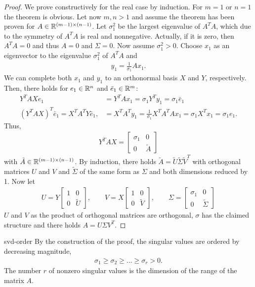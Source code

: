 \begin{proof}
  We prove constructively for the real case by induction. For $m=1$ or
  $n=1$ the theorem is obvious. Let now $m,n>1$ and assume the theorem
  has been proven for $A\in \mathbb R^{(m-1)\times (n-1)}$. Let $\sigma_1^2$
  be the largest eigenvalue of $A^TA$, which due to the symmetry of
  $A^TA$ is real and nonnegative. Actually, if it is zero, then
  $A^TA=0$ and thus $A=0$ and $\Sigma=0$. Now assume $\sigma_1^2 >
  0$. Choose $x_1$ as an eigenvector to the eigenvalue $\sigma_1^2$ of
  $A^TA$ and
  \begin{gather}
    y_1 = \frac1{\sigma_1} A x_1.
  \end{gather}
  We can complete both $x_1$ and $y_1$ to an orthonormal basis $X$ and
  $Y$, respectively. Then, there holds for $e_1 \in \mathbb R^n$ and
  $\bar e_1\in \mathbb R^m$:
  \begin{align}
    Y^TAX e_1 &= Y^T A x_1 = \sigma_1 Y^Ty_1 = \sigma_1 \bar e_1\\
    (Y^TAX)^T \bar e_1 = X^TA^TY\bar e_1,
              &= X^TA^T y_1 =  \tfrac1{\sigma_1} X^TA^TA x_1
                = \sigma_1 X^Tx_1 = \sigma_1 e_1.
  \end{align}
  Thus,
  \begin{gather}
    Y^TAX =
    \begin{bmatrix}
      \sigma_1 & 0 \\ 0 & \tilde A
    \end{bmatrix}
  \end{gather}
  with $\tilde A\in \mathbb R^{(m-1)\times (n-1)}$. By induction, there holds
  $\tilde A = \tilde U \tilde \Sigma \tilde V^T$ with orthogonal
  matrices $U$ and $V$ and $\tilde\Sigma$ of the same form as $\Sigma$
  and both dimensions reduced by 1. Now let
  \begin{gather}
    U = Y
    \begin{bmatrix}
      1 & 0\\ 0& \tilde U
    \end{bmatrix},
    \qquad
    V = X
    \begin{bmatrix}
      1 & 0 \\ 0& \tilde V
    \end{bmatrix},
    \qquad
    \Sigma =
    \begin{bmatrix}
      \sigma_1 & 0 \\ 0 & \tilde\Sigma
    \end{bmatrix}
  \end{gather}
  $U$ and $V$ as the product of orthogonal matrices are orthogonal,
  $\sigma$ has the claimed structure and there holds $A=U\Sigma V^T$.
\end{proof}

\begin{Corollary}{svd-order}
  By the construction of the proof, the singular values are ordered by
  decreasing magnitude,
  \begin{gather}
    \label{eq:svd:2}
    \sigma_1 \ge \sigma_2 \ge \dots \ge \sigma_r > 0.
  \end{gather}
  The number $r$ of nonzero singular values is the dimension of the
  range of the matrix $A$.
\end{Corollary}

